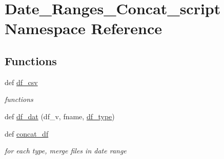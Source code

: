 \hypertarget{namespace_date___ranges___concat__script}{}\section{Date\+\_\+\+Ranges\+\_\+\+Concat\+\_\+script Namespace Reference}
\label{namespace_date___ranges___concat__script}
\subsection*{Functions}
\begin{DoxyCompactItemize}
\item 
def \hyperlink{namespace_date___ranges___concat__script_aa42aa5a36669a9e4fa69422b8bce9838}{df\+\_\+csv}
\begin{DoxyCompactList}\small\item\em functions \end{DoxyCompactList}\item 
def \hyperlink{namespace_date___ranges___concat__script_a302b0e35f8c93633acdf003f4f2d7543}{df\+\_\+dat} (df\+\_\+v, fname, \hyperlink{namespace_date___ranges___concat__script_ac33a88b539edf5ce073799879c45e2e8}{df\+\_\+type})
\item 
def \hyperlink{namespace_date___ranges___concat__script_ad955506c0e46fb40847aab5fd1059336}{concat\+\_\+df}
\begin{DoxyCompactList}\small\item\em for each type, merge files in date range \end{DoxyCompactList}\end{DoxyCompactItemize}
